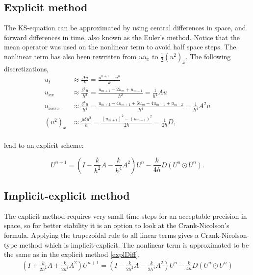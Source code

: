 \subsection{Explicit method}
The KS-equation can be approximated by using central differences in space, and forward differences in time, also known as the Euler's method. Notice that the mean operator was used on the nonlinear term to avoid half space steps.    The nonlinear term has also been rewritten from $uu_x$ to $\frac{1}{2}(u^2)_x$. The following discretizations,
\begin{equation*}
\begin{aligned}
u_t &\approx \frac{\Delta u}{k} = \frac{u^{n+1}-u^n}{k} \\
u_{xx} &\approx \frac{\delta^2 u}{h^2} = \frac{u_{m+1}-2u_{m}+u_{m-1}}{h^2} = \frac{1}{h^2}Au \\
u_{xxxx} &\approx \frac{\delta^4 u}{h^4} = \frac{u_{m+2}-4u_{m+1}+6u_m-4u_{m-1}+u_{m-2}}{h^4} = \frac{1}{h^4}A^2u\\
(u^2)_{x} &\approx \frac{\mu \delta u^2}{h} = \frac{(u_{m+1})^2-(u_{m-1})^2}{2h} = \frac{1}{2h}D,\\
\end{aligned}
\end{equation*}

lead to an explicit scheme:

\begin{equation}
\label{explDiff}
U^{n+1} = (I - \frac{k}{h^2}A - \frac{k}{h^4}A^2)U^n - \frac{k}{4h}D(U^{n}\odot U^n).
\end{equation}

\subsection{Implicit-explicit method}
The explicit method requires very small time steps for an acceptable precision in space, so for better stability it is an option to look at the Crank-Nicolson's formula. Applying the trapezoidal rule to all linear terms gives a Crank-Nicolson-type method which is implicit-explicit. The nonlinear term is approximated to be the same as in the explicit method \eqref{explDiff}.
\begin{align}
\label{implDiff}
(I + \frac{k}{2h^2}A + \frac{k}{2h^4}A^2)U^{n+1}
= (I - \frac{k}{2h^2}A - \frac{k}{2h^4}A^2)U^n - \frac{k}{4h}D(U^{n}\odot U^n)
\end{align}


